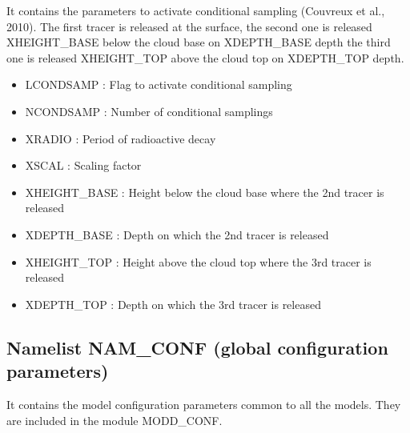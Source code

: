 It contains the parameters to activate conditional sampling (Couvreux et al., 2010).   
The first tracer is released at the surface,
the second one is released XHEIGHT\_BASE below the cloud base on XDEPTH\_BASE depth
the third one is released XHEIGHT\_TOP above the cloud top on XDEPTH\_TOP depth.
\begin{itemize}
\item LCONDSAMP :
Flag to activate conditional sampling                                          
\item NCONDSAMP :
Number of conditional samplings                                                                                                              
\item XRADIO  :
Period of radioactive decay                                    
\item XSCAL  :
Scaling factor                               
\item XHEIGHT\_BASE  :
Height below the cloud base where the 2nd tracer is released
\item XDEPTH\_BASE  :
Depth  on which the 2nd tracer is released
\item XHEIGHT\_TOP  :
Height above the cloud top where the 3rd tracer is released
\item XDEPTH\_TOP  :
Depth on which the 3rd tracer is released
\end{itemize}

\subsection{Namelist NAM\_CONF (global configuration parameters)}
It contains the model configuration parameters common to all the models. They
are included in the module MODD\_CONF. 


